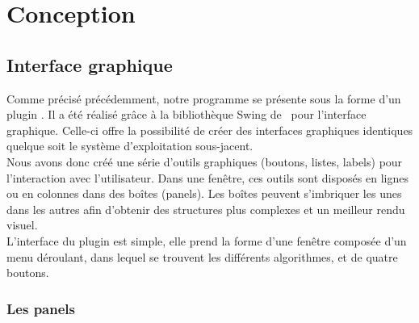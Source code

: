 \chapter{Conception}

\section{Interface graphique}

Comme précisé précédemment, notre programme se présente sous la forme d'un plugin \imj. Il a été réalisé grâce à la bibliothèque Swing de \java ~pour l'interface graphique. Celle-ci offre la possibilité de créer des interfaces graphiques identiques quelque soit le système d'exploitation sous-jacent.\\
Nous avons donc créé une série d'outils graphiques (boutons, listes, labels) pour l'interaction avec l'utilisateur. Dans une fenêtre, ces outils sont disposés en lignes ou en colonnes dans des boîtes (panels). Les boîtes peuvent s'imbriquer les unes dans les autres afin d'obtenir des structures plus complexes et un meilleur rendu visuel. \\
L'interface du plugin est simple, elle prend la forme d'une fenêtre composée d'un menu déroulant, dans lequel se trouvent les différents algorithmes, et de quatre boutons. \\

\subsection{Les panels}

